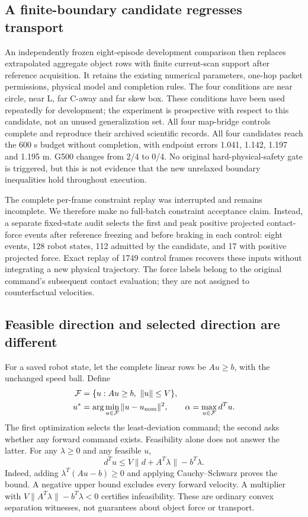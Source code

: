 \documentclass[letterpaper,10pt,conference]{ieeeconf}
\begin{document}
\subsection{A finite-boundary candidate regresses transport}
An independently frozen eight-episode development comparison then replaces extrapolated aggregate object rows with finite current-scan support after reference acquisition. It retains the existing numerical parameters, one-hop packet permissions, physical model and completion rules. The four conditions are near circle, near L, far C-away and far skew box. These conditions have been used repeatedly for development; the experiment is prospective with respect to this candidate, not an unused generalization set. All four map-bridge controls complete and reproduce their archived scientific records. All four candidates reach the 600 s budget without completion, with endpoint errors 1.041, 1.142, 1.197 and 1.195 m. G500 changes from 2/4 to 0/4. No original hard-physical-safety gate is triggered, but this is not evidence that the new unrelaxed boundary inequalities hold throughout execution.

The complete per-frame constraint replay was interrupted and remains incomplete. We therefore make no full-batch constraint acceptance claim. Instead, a separate fixed-state audit selects the first and peak positive projected contact-force events after reference freezing and before braking in each control: eight events, 128 robot states, 112 admitted by the candidate, and 17 with positive projected force. Exact replay of 1749 control frames recovers these inputs without integrating a new physical trajectory. The force labels belong to the original command's subsequent contact evaluation; they are not assigned to counterfactual velocities.

\subsection{Feasible direction and selected direction are different}
For a saved robot state, let the complete linear rows be $Au\geq b$, with the unchanged speed ball. Define
\begin{align}
\mathcal F&=\{u:Au\geq b,\ \|u\|\leq V\},\\
u^*&=\arg\min_{u\in\mathcal F}\|u-u_{\rm nom}\|^2,\qquad
\alpha=\max_{u\in\mathcal F}d^Tu.
\end{align}
The first optimization selects the least-deviation command; the second asks whether any forward command exists. Feasibility alone does not answer the latter. For any $\lambda\geq0$ and any feasible $u$,
\begin{equation}
d^Tu\leq V\|d+A^T\lambda\|-b^T\lambda.
\label{eq:dual}
\end{equation}
Indeed, adding $\lambda^T(Au-b)\geq0$ and applying Cauchy--Schwarz proves the bound. A negative upper bound excludes every forward velocity. A multiplier with $V\|A^T\lambda\|-b^T\lambda<0$ certifies infeasibility. These are ordinary convex separation witnesses, not guarantees about object force or transport.
\end{document}
